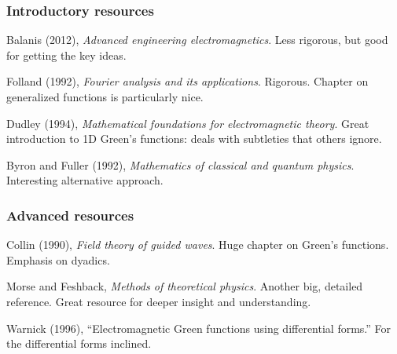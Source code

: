 \documentclass[12 pt, compress, handout, intlimits]{beamer}
\begin{document}
\begin{frame}[fragile]
    \frametitle{Introductory resources}
    Balanis (2012), \emph{Advanced engineering electromagnetics}. 
    Less rigorous, but good for getting the key ideas.

    Folland (1992), \emph{Fourier analysis and its applications}. 
    Rigorous. Chapter on generalized functions is particularly nice.

    Dudley (1994), \emph{Mathematical foundations for electromagnetic theory}.
    Great introduction to 1D Green's functions: deals with subtleties that others ignore.

    Byron and Fuller (1992), \emph{Mathematics of classical and quantum physics}.
    Interesting alternative approach.
    
\end{frame}

\note{}

\begin{frame}[fragile]
    \frametitle{Advanced resources}
    Collin (1990), \emph{Field theory of guided waves}. 
    Huge chapter on Green's functions. Emphasis on dyadics.

    Morse and Feshback, \emph{Methods of theoretical physics}.
    Another big, detailed reference. Great resource for deeper insight and understanding.

    Warnick (1996), ``Electromagnetic Green functions using differential forms.''
    For the differential forms inclined.

\end{frame}    

\note{}
\end{document}
